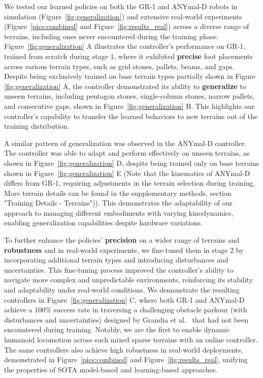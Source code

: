 \documentclass[9pt,twocolumn,twoside]{osajnl}
\begin{document}
We tested our learned policies on both the GR-1 and ANYmal-D robots in simulation (Figure~\ref{fig:generalization}) and extensive real-world experiments (Figure~\ref{pics:combined} and Figure~\ref{fig:results_real}) across a diverse range of terrains, including ones never encountered during the training phase. 
Figure~\ref{fig:generalization} A illustrates the controller’s performance on GR-1, trained from scratch during stage 1, where it exhibited \textbf{precise} foot placements across various terrain types, such as grid stones, pallets, beams, and gaps. Despite being exclusively trained on base terrain types partially shown in Figure \ref{fig:generalization} A, the controller demonstrated its ability to \textbf{generalize} to unseen terrains, including pentagon stones, single-column stones, narrow pallets, and consecutive gaps, shown in Figure~\ref{fig:generalization} B. This highlights our controller's capability to transfer the learned behaviors to new terrains out of the training distribution.

A similar pattern of generalization was observed in the ANYmal-D controller. The controller was able to adapt and perform effectively on unseen terrains, as shown in Figure~\ref{fig:generalization} D, despite being trained only on base terrains shown in Figure~\ref{fig:generalization} E (Note that the kinematics of ANYmal-D differs from GR-1, requiring adjustments in the terrain selection during training. More terrain details can be found in the supplementary methods, section "Training Details - Terrains")). This demonstrates the adaptability of our approach to managing different embodiments with varying kinodynamics, enabling generalization capabilities despite hardware variations.

To further enhance the policies’ \textbf{precision} on a wider range of terrains and \textbf{robustness} and in real-world experiments, we fine-tuned them in stage 2 by incorporating additional terrain types and introducing disturbances and uncertainties. This fine-tuning process improved the controller's ability to navigate more complex and unpredictable environments, reinforcing its stability and adaptability under real-world conditions. We demonstrate the resulting controllers in Figure~\ref{fig:generalization} C, where both GR-1 and ANYmal-D achieve a 100\% success rate in traversing a challenging obstacle parkour (with disturbances and uncertainties) designed by Grandia et al.~\cite{Ruben2022} that had not been encountered during training. Notably, we are the first to enable dynamic humanoid locomotion across such mixed sparse terrains with an online controller. The same controllers also achieve high robustness in real-world deployments, demonstrated in Figure~\ref{pics:combined} and Figure~\ref{fig:results_real}, unifying the properties of SOTA model-based and learning-based approaches.
\end{document}
